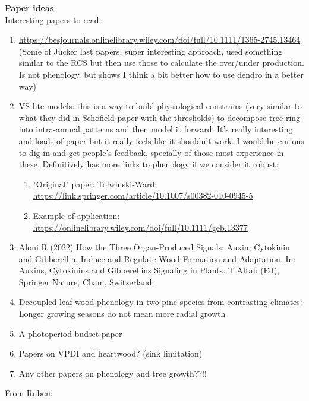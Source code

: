 \documentclass[11pt,letter]{article}
\begin{document}
{\bf Paper ideas}\\
Interesting papers to read:
\begin{enumerate}
\item \url{https://besjournals.onlinelibrary.wiley.com/doi/full/10.1111/1365-2745.13464} (Some of Jucker last papers, super interesting approach, used something similar to the RCS but then use those to calculate the over/under production. Is not phenology, but shows I think a bit better how to use dendro in a better way)
\item VS-lite models: this is a way to build physiological constrains (very similar to what they did in Schofield paper with the thresholds) to decompose tree ring into intra-annual patterns and then model it forward. It's really interesting and loads of paper but it really feels like it shouldn't work. I would be curious to dig in and get people's feedback, specially of those most experience in these. Definitively has more links to phenology if we consider it robust:
\begin{enumerate}
\item "Original" paper: Tolwinski-Ward: \url{https://link.springer.com/article/10.1007/s00382-010-0945-5}
\item Example of application: \url{https://onlinelibrary.wiley.com/doi/full/10.1111/geb.13377}
\end{enumerate}
\item Aloni R (2022) How the Three Organ-Produced Signals: Auxin, Cytokinin and Gibberellin, Induce and Regulate Wood Formation and Adaptation. In: Auxins, Cytokinins and Gibberellins Signaling in Plants. T Aftab (Ed), Springer Nature, Cham, Switzerland. %
\item Decoupled leaf-wood phenology in two pine species from contrasting climates: Longer growing seasons do not mean more radial growth
\item A photoperiod-budset paper
\item Papers on VPDI and heartwood? (sink limitation)
\item Any other papers on phenology and tree growth??!!
\end{enumerate}



From Ruben:
\end{document}
